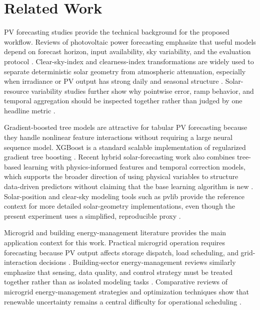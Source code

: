 
\section{Related Work}
\label{sec:related}

PV forecasting studies provide the technical background for the proposed workflow. Reviews of photovoltaic power forecasting emphasize that useful models depend on forecast horizon, input availability, sky variability, and the evaluation protocol \cite{AntonanzasPVForecastingReview2016,YangSolarForecastVerification2020}. Clear-sky-index and clearness-index transformations are widely used to separate deterministic solar geometry from atmospheric attenuation, especially when irradiance or PV output has strong daily and seasonal structure \cite{LauretBenchmarkingML2015,LauretClearSkyIndex2022}. Solar-resource variability studies further show why pointwise error, ramp behavior, and temporal aggregation should be inspected together rather than judged by one headline metric \cite{PerezVariability2016}.

Gradient-boosted tree models are attractive for tabular PV forecasting because they handle nonlinear feature interactions without requiring a large neural sequence model. XGBoost is a standard scalable implementation of regularized gradient tree boosting \cite{ChenXGBoost2016}. Recent hybrid solar-forecasting work also combines tree-based learning with physics-informed features and temporal correction models, which supports the broader direction of using physical variables to structure data-driven predictors without claiming that the base learning algorithm is new \cite{PhysicsInformedXGBLSTM2026}. Solar-position and clear-sky modeling tools such as pvlib provide the reference context for more detailed solar-geometry implementations, even though the present experiment uses a simplified, reproducible proxy \cite{HolmgrenPvlib2018}.

Microgrid and building energy-management literature provides the main application context for this work. Practical microgrid operation requires forecasting because PV output affects storage dispatch, load scheduling, and grid-interaction decisions \cite{ref01}. Building-sector energy-management reviews similarly emphasize that sensing, data quality, and control strategy must be treated together rather than as isolated modeling tasks \cite{ref02}. Comparative reviews of microgrid energy-management strategies and optimization techniques show that renewable uncertainty remains a central difficulty for operational scheduling \cite{ref05,ref06,ref11}.

